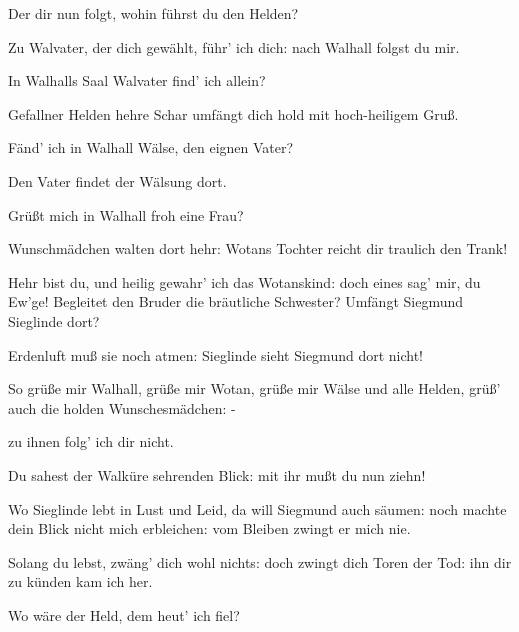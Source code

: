 \begin{drama}
\Siegmundspeaks


Der dir nun folgt, wohin führst du den Helden?
 

\Brunnhildespeaks
Zu Walvater, der dich gewählt,
führ' ich dich: nach Walhall folgst du mir.
 

\Siegmundspeaks
In Walhalls Saal Walvater find' ich allein?
 

\Brunnhildespeaks
Gefallner Helden hehre Schar
umfängt dich hold mit hoch-heiligem Gruß.
 

\Siegmundspeaks
Fänd' ich in Walhall Wälse, den eignen Vater?
 

\Brunnhildespeaks
Den Vater findet der Wälsung dort.
 

\Siegmundspeaks
Grüßt mich in Walhall froh eine Frau?
 

\Brunnhildespeaks
Wunschmädchen walten dort hehr:
Wotans Tochter reicht dir traulich den Trank!
 

\Siegmundspeaks
Hehr bist du,
und heilig gewahr' ich das Wotanskind:
doch eines sag' mir, du Ew'ge!
Begleitet den Bruder die bräutliche Schwester?
Umfängt Siegmund Sieglinde dort?
 

\Brunnhildespeaks
Erdenluft muß sie noch atmen:
Sieglinde sieht Siegmund dort nicht!
 

\Siegmundspeaks


So grüße mir Walhall, grüße mir Wotan,
grüße mir Wälse und alle Helden,
grüß' auch die holden Wunschesmädchen: -
 



zu ihnen folg' ich dir nicht.
 

\Brunnhildespeaks
Du sahest der Walküre sehrenden Blick:
mit ihr mußt du nun ziehn!
 

\Siegmundspeaks
Wo Sieglinde lebt in Lust und Leid,
da will Siegmund auch säumen:
noch machte dein Blick nicht mich erbleichen:
vom Bleiben zwingt er mich nie.
 

\Brunnhildespeaks
Solang du lebst, zwäng' dich wohl nichts:
doch zwingt dich Toren der Tod:
ihn dir zu künden kam ich her.
 

\Siegmundspeaks
Wo wäre der Held, dem heut' ich fiel?
 


\end{drama}
